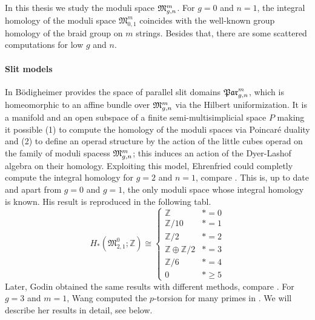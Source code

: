 In this thesis we study the moduli space $\mathfrak{M}^m_{g,n}$.
For $g=0$ and $n=1$, the integral homology of the moduli space $\mathfrak{M}_{0,1}^m$ coincides with the well-known group homology of the braid group on $m$ strings.
Besides that, there are some scattered computations for low $g$ and $n$.

\paragraph{Slit models}
In \cite{Boedigheimer19901} Bödigheimer provides the space of parallel slit domains $\mathfrak{Par}_{g,n}^m$, which is homeomorphic to an affine bundle over $\mathfrak{M}^m_{g,n}$ via the Hilbert uniformization.
It is a manifold and an open subspace of a finite semi-multisimplicial space $P$ making it possible
(1) to compute the homology of the moduli spaces via Poincaré duality and
(2) to define an operad structure by the action of the little cubes operad on the family of moduli spacess $\mathfrak{M}^m_{g,n}$;
this induces an action of the Dyer-Lashof algebra on their homology.
Exploiting this model, Ehrenfried could completly compute the integral homology for $g=2$ and $n=1$, compare \cite{Ehrenfried1997}.
This is, up to date and apart from $g=0$ and $g=1$, the only moduli space whose integral homology is known. 
His result is reproduced in the following tabl.
\[
    H_\ast( \mathfrak{M}_{2,1}^0; \mathbb Z) \cong
        \begin{cases}
            \mathbb Z                           & \ast = 0\\
            \mathbb Z/10                        & \ast = 1\\
            \mathbb Z/2                         & \ast = 2\\
            \mathbb Z \oplus \mathbb Z/2        & \ast = 3\\
            \mathbb Z/6                         & \ast = 4\\
            0                                   & \ast \ge 5
        \end{cases}
\]
Later, Godin obtained the same results with different methods, compare \cite{Godin2007}.
For $g=3$ and $m=1$, Wang computed the $p$-torsion for many primes in \cite{Wang201102}.
We will describe her results in detail, see below.

